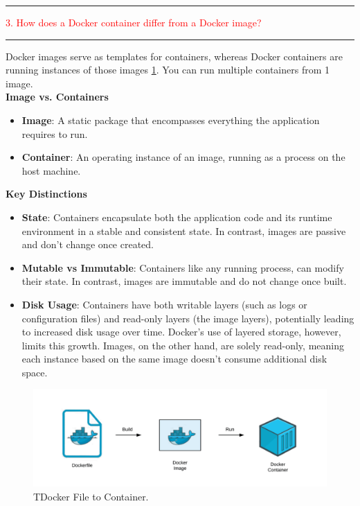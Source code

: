 \documentclass{article}
\begin{document}
\noindent
{\color{red} \rule{\linewidth}{0.5mm}}
\textcolor{red}{3. How does a Docker container differ from a Docker image?} \\
\noindent
{\color{red} \rule{\linewidth}{0.5mm}}
Docker images serve as templates for containers, whereas Docker containers are running instances of those images \ref{fig:Docker1}. You can run multiple containers from 1 image.   \\
\textbf{Image vs. Containers} \\
\begin{itemize}
\color{blue}
\item \textbf{Image}: A static package that encompasses everything the application requires to run.
\item \textbf{Container}: An operating instance of an image, running as a process on the host machine.
\end{itemize}
\textbf{Key Distinctions}
\begin{itemize}
\color{blue}
\item \textbf{State}: Containers encapsulate both the application code and its runtime environment in a stable and consistent state. In contrast, images are passive and don't change once created.
\item \textbf{Mutable vs Immutable}: Containers like any running process, can modify their state. In contrast, images are immutable and do not change once built.
\item \textbf{Disk Usage}: Containers have both writable layers (such as logs or configuration files) and read-only layers (the image layers), potentially leading to increased disk usage over time. Docker's use of layered storage, however, limits this growth. Images, on the other hand, are solely read-only, meaning each instance based on the same image doesn't consume additional disk space. 
\end{itemize}



\begin{figure}
\centering
\includegraphics[width=0.95\linewidth]{Docker1.jpg}
\caption{\label{fig:Docker1}TDocker File to Container.}
\end{figure}
\end{document}
